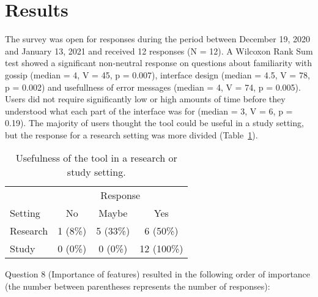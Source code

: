 
\section{Results}

The survey was open for responses during the period between December 19, 2020 and January 13, 2021 and received 12 responses (N = 12).
A Wilcoxon Rank Sum test showed a significant non-neutral response on questions about familiarity with gossip (median = 4, V = 45, p = 0.007), interface design (median = 4.5, V = 78, p = 0.002) and usefullness of error messages (median = 4, V = 74, p = 0.005).
Users did not require significantly low or high amounts of time before they understood what each part of the interface was for (median = 3, V = 6, p = 0.19).
The majority of users thought the tool could be useful in a study setting, but the response for a research setting was more divided (Table~\ref{tab:setting-usefulness}).

\begin{table}[htb!]
    \centering
    \caption{Usefulness of the tool in a research or study setting.}
    \label{tab:setting-usefulness}
    \begin{tabular}{lccc}
        \toprule
                    & \multicolumn{3}{c}{Response}          \\\cmidrule{2-4}
        Setting     & No        & Maybe     & Yes           \\
        \midrule
        Research    & 1 (8\%)   & 5 (33\%)  & 6 (50\%)      \\
        Study       & 0 (0\%)   & 0 (0\%)   & 12 (100\%)    \\
        \bottomrule
    \end{tabular}
\end{table}

Question 8 (Importance of features) resulted in the following order of importance (the number between parentheses represents the number of responses):

